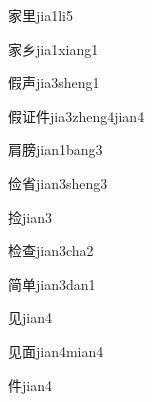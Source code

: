 \begin{verbete}[10;7]{家里}{jia1li5}
\end{verbete}

\begin{verbete}[10;3]{家乡}{jia1xiang1}
\end{verbete}

\begin{verbete}[11;7]{假声}{jia3sheng1}
\end{verbete}

\begin{verbete}[11;7;6]{假证件}{jia3zheng4jian4}
\end{verbete}

\begin{verbete}[8;14]{肩膀}{jian1bang3}
\end{verbete}

\begin{verbete}[9;9]{俭省}{jian3sheng3}
\end{verbete}

\begin{verbete}[10]{捡}{jian3}
\end{verbete}

\begin{verbete}[11;9]{检查}{jian3cha2}
\end{verbete}

\begin{verbete}[13;8]{简单}{jian3dan1}
\end{verbete}

\begin{verbete}[4]{见}{jian4}
\end{verbete}

\begin{verbete}[4;9]{见面}{jian4mian4}
\end{verbete}

\begin{verbete}[6]{件}{jian4}
\end{verbete}

